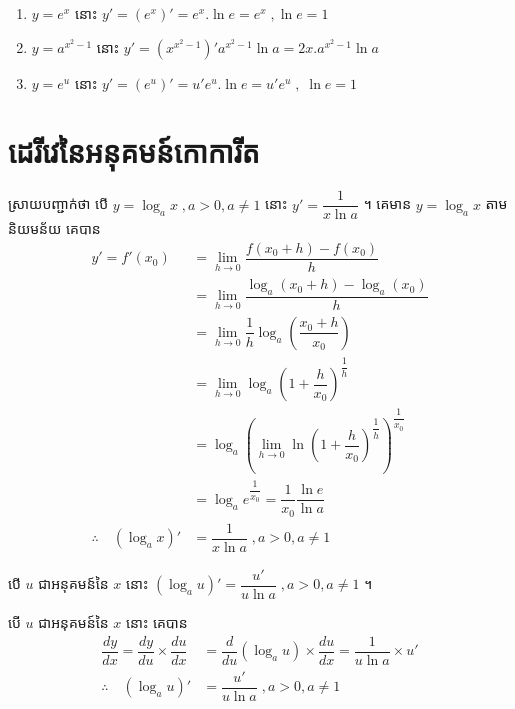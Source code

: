 \documentclass[a4paper,12pt]{article}
\begin{document}
\answer
\begin{enumerate}
	\item  $y=e^x$ នោះ $y'=(e^x)'=e^x.\ln e=e^x\;,\ln e=1$
	\item $y=a^{x^2-1}$ នោះ $y'=(x^{x^2-1})'a^{x^2-1}\ln a=2x.a^{x^2-1}\ln a$
	\item $y=e^u$ នោះ $y'=(e^u)'=u'e^u.\ln e=u'e^u\;,\;\ln e=1$
\end{enumerate}
\section{ដេរីវេនៃអនុគមន៍កោការីត}
ស្រាយបញ្ជាក់ថា បើ $y=\log _a x \;, a>0,a\neq 1$ នោះ $y'=\dfrac{1}{x\ln a}$ ។
\solution
គេមាន $y=\log_a x$ តាមនិយមន័យ គេបាន
\begin{align*}
	y'=f'(x_0)                   & =\lim_{h\to 0}\dfrac{f(x_0+h)-f(x_0)}{h}                                                          \\
	                             & =\lim_{h\to 0}\dfrac{\log_a (x_0+h)-\log_a (x_0)}{h}                                              \\
	                             & =\lim_{h\to 0}\dfrac{1}{h}\log_a \left(\dfrac{x_0+h}{x_0} \right)                                 \\
	                             & =\lim_{h\to 0}\log_a \left(1+\dfrac{h}{x_0} \right)^\dfrac{1}{h}                                  \\
	                             & =\log_a \left(\lim_{h\to 0}\ln \left(1+\dfrac{h}{x_0}\right)^{\dfrac{1}{h}}\right)^\dfrac{1}{x_0} \\
	                             & =\log_a e^{\dfrac{1}{x_0}}=\dfrac{1}{x_0}\dfrac{\ln e}{\ln a}                                     \\
	\therefore \quad (\log_a x)' & =\dfrac{1}{x\ln a}\;, a>0,a\neq 1
\end{align*}

\begin{general}
	បើ $u$ ជាអនុគមន៍នៃ $x$ នោះ $(\log_a u)'=\dfrac{u'}{u\ln a}\;, a>0,a\neq 1$ ។
\end{general}
\solution
បើ $u$ ជាអនុគមន៍នៃ $x$ នោះ  គេបាន
\begin{align*}
	\dfrac{dy}{dx}=\dfrac{dy}{du}\times \dfrac{du}{dx} & =\dfrac{d}{du}(\log_a u)\times \dfrac{du}{dx}=\dfrac{1}{u\ln a}\times u' \\
	\therefore \quad (\log_a u)'                       & =\dfrac{u'}{u\ln a} \;, a>0,a\neq 1
\end{align*}
\end{document}
